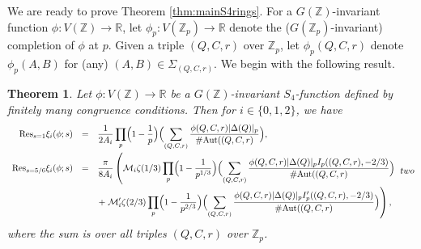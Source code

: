 \documentclass{article}
\def\Z{{\mathbb Z}}
\def\Aut{{\rm Aut}}
\def\Res{{\rm Res}}
\def\R{{\mathbb R}}
\def\Z{{\mathbb Z}}
\newtheorem{theorem}{Theorem}[section]
\begin{document}
We are ready to prove Theorem \ref{thm:mainS4rings}. 
For a $G(\Z)$-invariant function $\phi:V(\Z)\to\R$, let $\phi_p:V(\Z_p)\to\R$ denote the ($G(\Z_p)$-invariant) completion of $\phi$ at $p$. Given a triple $(Q,C,r)$ over $\Z_p$, let $\phi_p(Q,C,r)$ denote $\phi_p(A,B)$ for (any) $(A,B)\in \Sigma_{(Q,C,r)}$. We begin with the following result.
\begin{theorem}\label{thm:residues_final}
Let $\phi:V(\Z)\to\R$ be a $G(\Z)$-invariant $S_4$-function defined by finitely many congruence conditions. Then for $i\in\{0,1,2\}$, we have
\begin{equation*}
\begin{array}{rcl}
\Res_{s=1}\xi_{i}(\phi;s)&=&\displaystyle \frac{1}{2A_i}\prod_p
\Bigl(1-\frac{1}{p}\Bigr)\Bigl(\sum_{(Q,C,r)}\frac{\phi(Q,C,r)|\Delta(Q)|_p}{\#\Aut((Q,C,r)}\Bigr),
\\[.2in]
\Res_{s=5/6}\xi_{i}(\phi;s)&=&\displaystyle\frac{\pi}{8A_i}
\left(
\mathcal M_i\zeta(1/3)\prod_p\Bigl(1-\frac{1}{p^{1/3}}\Bigr)
\Bigl(\sum_{(Q,C,r)}\frac{\phi(Q,C,r)|\Delta(Q)|_pI_p((Q,C,r),-2/3)}{\#\Aut((Q,C,r)}\Bigr)\right.
\\[.2in]
&&\displaystyle \left. +\;
\mathcal M_i'\zeta(2/3)\prod_p\Bigl(1-\frac{1}{p^{2/3}}\Bigr)
\Bigl(\sum_{(Q,C,r)}\frac{\phi(Q,C,r)|\Delta(Q)|_pI'_p((Q,C,r),-2/3)}{\#\Aut((Q,C,r)}\Bigr)
\right),
\end{array}two
\end{equation*}
where the sum is over all triples $(Q,C,r)$ over $\Z_p$.
\end{theorem}
\end{document}

